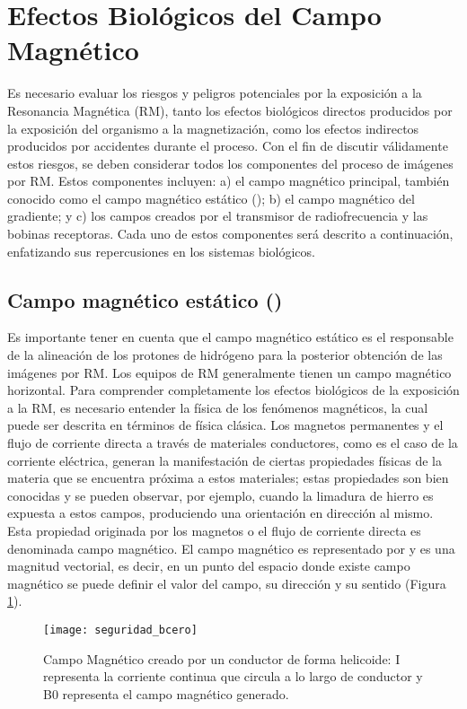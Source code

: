 \section{Efectos Biológicos del Campo Magnético}

Es necesario evaluar los riesgos y peligros potenciales por la exposición a la Resonancia Magnética (RM), tanto los efectos biológicos directos producidos por la exposición del organismo a la magnetización, como los efectos indirectos producidos por accidentes durante el proceso. Con el fin de discutir válidamente estos riesgos, se deben considerar todos los componentes del proceso de imágenes por RM. Estos componentes incluyen: a) el campo magnético principal, también conocido como el campo magnético estático (\Bzero); b) el campo magnético del gradiente; y c) los campos creados por el transmisor de radiofrecuencia y las bobinas receptoras. Cada uno de estos componentes será descrito a continuación, enfatizando sus repercusiones en los sistemas biológicos.

\subsection{Campo magnético estático (\Bzero)}

Es importante tener en cuenta que el campo magnético estático es el responsable de la alineación de los protones de hidrógeno para la posterior obtención de las imágenes por RM. Los equipos de RM generalmente tienen un campo magnético horizontal.  Para comprender completamente los efectos biológicos de la exposición a la RM, es necesario entender la física de los fenómenos magnéticos, la cual puede ser descrita en términos de física clásica.   Los magnetos permanentes y el flujo de corriente directa a través de materiales conductores, como es el caso de la corriente eléctrica, generan la manifestación de ciertas propiedades físicas de la materia que se encuentra próxima a estos materiales; estas propiedades son bien conocidas y se pueden observar, por ejemplo, cuando la limadura de hierro es expuesta a estos campos, produciendo una orientación en dirección al mismo. Esta propiedad originada por los magnetos o el flujo de corriente directa es denominada campo magnético. El campo magnético es representado por \Bzero y es una magnitud vectorial, es decir, en un punto del espacio donde existe campo magnético se puede definir el valor del campo, su dirección y su sentido (Figura \ref{fig:seguridad_bcero}). 

\begin{figure}[htb]
\begin{figg}
   \texttt{[image: seguridad\_bcero]}
   \caption{Campo Magnético creado por un conductor de forma helicoide: I representa la corriente continua que circula a lo largo de conductor y B0 representa el campo magnético generado. }
 \label{fig:seguridad_bcero}
 \end{figg}
\end{figure}




